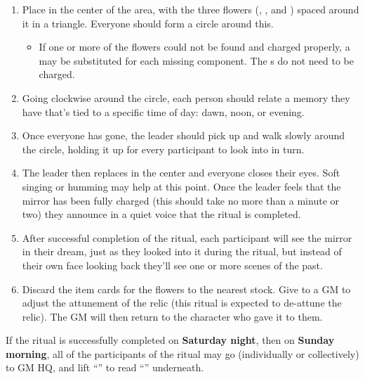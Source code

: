 \documentclass[green]{GL2020}
\begin{document}
\begin{enumerate}
\begin{itemize}
  \end{itemize}
  \item Place \iMirror{} in the center of the area, with the three flowers (\iMorningGlory{}, \iLily{}, and \iMoonflower{}) spaced around it in a triangle. Everyone should form a circle around this.
  \begin{itemize}
  \item If one or more of the flowers could not be found and charged properly, a \iStoneFlower{} may be substituted for each missing component. The \iStoneFlower{}s do not need to be charged.
  \end{itemize}
  \item Going clockwise around the circle, each person should relate a memory they have that’s tied to a specific time of day: dawn, noon, or evening.
  \item Once everyone has gone, the leader should pick up \iMirror{} and walk slowly around the circle, holding it up for every participant to look into in turn.
  \item The leader then replaces \iMirror{} in the center and everyone closes their eyes. Soft singing or humming may help at this point. Once the leader feels that the mirror has been fully charged (this should take no more than a minute or two) they announce in a quiet voice that the ritual is completed.
  \item After successful completion of the ritual, each participant  will see the mirror in their dream, just as they looked into it during the ritual, but instead of their own face looking back they’ll see one or more scenes of the past.
  \item Discard the item cards for the flowers to the nearest stock. Give \iMirror{} to a GM to adjust the attunement of the relic (this ritual is expected to de-attune the relic). The GM will then return \iMirror{} to the character who gave it to them.
\end{enumerate}

If the ritual is successfully completed on \textbf{Saturday night}, then on \textbf{Sunday morning}, all of the participants of the ritual may go (individually or collectively) to GM HQ, and lift ``\sSignCOne{}'' to read ``\sSignCTwo{}'' underneath.
\end{document}
